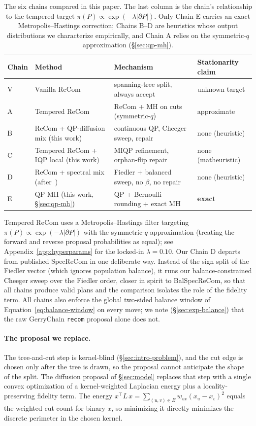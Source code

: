 \documentclass[11pt]{article}
\begin{document}
\begin{table}[H]
\centering
\small
\begin{tabular}{llll}
\toprule
Chain & Method & Mechanism & Stationarity claim \\
\midrule
V & Vanilla ReCom~\cite{deford2021recombination} & spanning-tree split, always accept & unknown target \\
A & Tempered ReCom & ReCom + MH on cuts (symmetric-$q$) & approximate \\
B & ReCom + QP-diffusion mix (this work) & continuous QP, Cheeger sweep, repair & none (heuristic) \\
C & Tempered ReCom + IQP local (this work) & MIQP refinement, orphan-flip repair & none (matheuristic) \\
D & ReCom + spectral mix (after~\cite{davies2025spectral}) & Fiedler + balanced sweep, no $\beta$, no repair & none (heuristic) \\
E & QP-MH (this work, \S\ref{sec:qp-mh}) & QP + Bernoulli rounding + exact MH & \textbf{exact} \\
\bottomrule
\end{tabular}
\caption{The six chains compared in this paper. The last column is the
  chain's relationship to the tempered target
  $\pi(P) \propto \exp(-\lambda|\partial P|)$. Only Chain E carries an
  exact Metropolis--Hastings correction; Chains B--D are heuristics
  whose output distributions we characterize empirically, and Chain A
  relies on the symmetric-$q$ approximation
  (\S\ref{sec:qp-mh}).}
\label{tab:five-chains}
\end{table}

Tempered ReCom uses a Metropolis--Hastings filter targeting
$\pi(P) \propto \exp(-\lambda |\partial P|)$ with the symmetric-$q$
approximation (treating the forward and reverse proposal probabilities
as equal); see Appendix~\ref{app:hyperparams} for the locked-in
$\lambda = 0.10$. Our Chain D departs from published SpecReCom in one
deliberate way. Instead of the sign split of the Fiedler vector (which
ignores population balance), it runs our balance-constrained Cheeger
sweep over the Fiedler order, closer in spirit to BalSpecReCom, so that all chains produce valid plans and the comparison isolates the
role of the fidelity term. All chains also enforce the global
two-sided balance window of Equation~\eqref{eq:balance-window} on
every move; we note (\S\ref{sec:exp-balance}) that the raw GerryChain
\texttt{recom} proposal alone does not.

\paragraph{The proposal we replace.}\label{sec:background-weakness}
The tree-and-cut step is kernel-blind (\S\ref{sec:intro-problem}),
and the cut edge is chosen only after the tree is drawn, so the
proposal cannot anticipate the shape of the split. The diffusion
proposal of \S\ref{sec:model} replaces that step with a single convex
optimization of a kernel-weighted Laplacian energy plus a
locality-preserving fidelity term. The energy
$x^\top L\, x = \sum_{(u,v) \in E} w_{uv} (x_u - x_v)^2$ equals the
weighted cut count for binary $x$, so minimizing it directly
minimizes the discrete perimeter in the chosen kernel.
\end{document}
